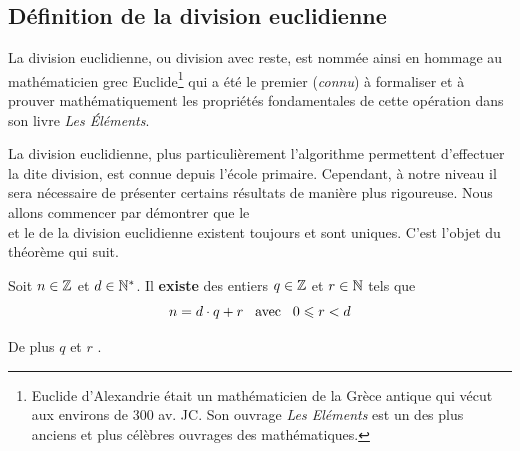 \subsection{Définition de la division euclidienne}

La division euclidienne, ou division avec reste, est nommée ainsi en hommage au mathématicien grec Euclide\footnote{Euclide d'Alexandrie était un mathématicien de la Grèce antique qui vécut aux environs de 300 av. JC. Son ouvrage \textit{Les Eléments}  est un des plus anciens et plus célèbres ouvrages des mathématiques.} qui  a été le premier (\textit{connu}) à formaliser et à prouver mathématiquement les propriétés fondamentales de cette opération dans son livre \textit{Les Éléments}.

\medskip
La division euclidienne, plus particulièrement l'algorithme permettent d'effectuer la dite division, est connue depuis l'école primaire. Cependant, à notre niveau il sera  nécessaire de présenter certains résultats de manière plus rigoureuse. Nous allons commencer par démontrer que le \\ et le  de la division euclidienne existent toujours et sont uniques. C'est l'objet du théorème qui suit. %


\begin{theoreme}\label{thm:div_eucl}
Soit $n\in\mathbb{Z}$ et $d\in\mathbb{N}^{\ast}$.
Il \textbf{existe} des entiers $q\in\mathbb{Z}$ et $r\in\mathbb{N}$ tels que 
$$n=d\cdot q+r \hspace{3mm}\textrm{avec}\hspace{3mm} 0\leqslant r < d$$

De plus $q$ et $r$ .
\end{theoreme}
\clearpage


